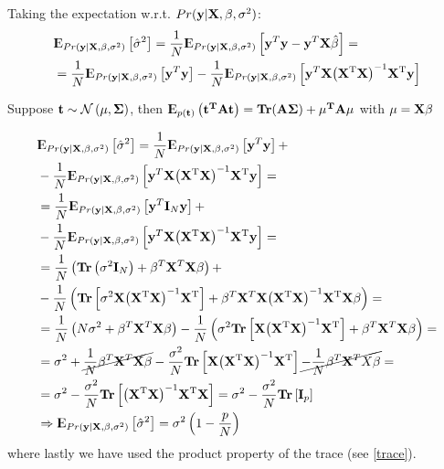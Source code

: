 Taking the expectation w.r.t. $Pr(\y|\X,\beta, \sigma^2)$:
\begin{equation}
\begin{aligned}
&\E_{Pr(\y|\X,\beta, \sigma^2)} \left[\hs\right] = \frac{1}{N}\E_{Pr(\y|\X,\beta, \sigma^2)} \left[\y^T\y - \y^T\X\hb \right] =\\
&=\frac{1}{N}\E_{Pr(\y|\X,\beta, \sigma^2)} \left[\y^T\y \right] - \frac{1}{N}\E_{Pr(\y|\X,\beta, \sigma^2)} \left[\y^T\X\HM \y \right] 
\end{aligned}
\end{equation}

Suppose $\mathbf{t} \sim  \CMcal{N}\left(\mathbf{\mu}, \mathbf{\Sigma} \right)$, then $\E_{p(\mathbf{t})} \left( \mathbf{t^TAt}\right)= \Tr(\mathbf{A\Sigma})+\mathbf{\mu^TA\mu}$ with $\mu = \X\beta$

\begin{equation}
\begin{aligned}
&\E_{Pr(\y|\X,\beta, \sigma^2)} \left[\hs\right] =\frac{1}{N}\E_{Pr(\y|\X,\beta, \sigma^2)} \left[\y^T\y \right] +\\
&- \frac{1}{N}\E_{Pr(\y|\X,\beta, \sigma^2)} \left[\y^T\X\HM \y \right]  = \\
&= \frac{1}{N}\E_{Pr(\y|\X,\beta, \sigma^2)} \left[\y^T\mathbf{I}_N\y \right] +\\
&- \frac{1}{N}\E_{Pr(\y|\X,\beta, \sigma^2)} \left[\y^T\X\HM \y \right]  = \\
&=\frac{1}{N}\left(\Tr\left(\sigma^2\mathbf{I}_N\right) +\beta^T\X^T\X\beta \right) + \\
&- \frac{1}{N}\left(\Tr\left[\sigma^2\X\HM\right] +\beta^T\X^T\X\HM\X\beta  \right) =\\
&= \frac{1}{N}\left(N\sigma^2 +\beta^T\X^T\X\beta \right) - \frac{1}{N}\left(\sigma^2\Tr\left[\X\HM\right] +\beta^T\X^T\X\beta  \right) =\\
&= \sigma^2 +\cancel{\frac{1}{N}\beta^T\X^T\X\beta} -\frac{\sigma^2}{N}\Tr\left[\X\HM\right] \cancel{-\frac{1}{N}\beta^T\X^TX\beta} = \\
&=\sigma^2 -\frac{\sigma^2}{N}\Tr\left[\HM\X\right] = \sigma^2 -\frac{\sigma^2}{N}\Tr\left[\mathbf{I}_p\right]  \\
&\Rightarrow \E_{Pr(\y|\X,\beta, \sigma^2)} \left[\hs\right] = \sigma^2 \left( 1 - \frac{p}{N}\right)
\end{aligned}
\end{equation}
where lastly we have used the product property of the trace (see \autoref{trace}).

